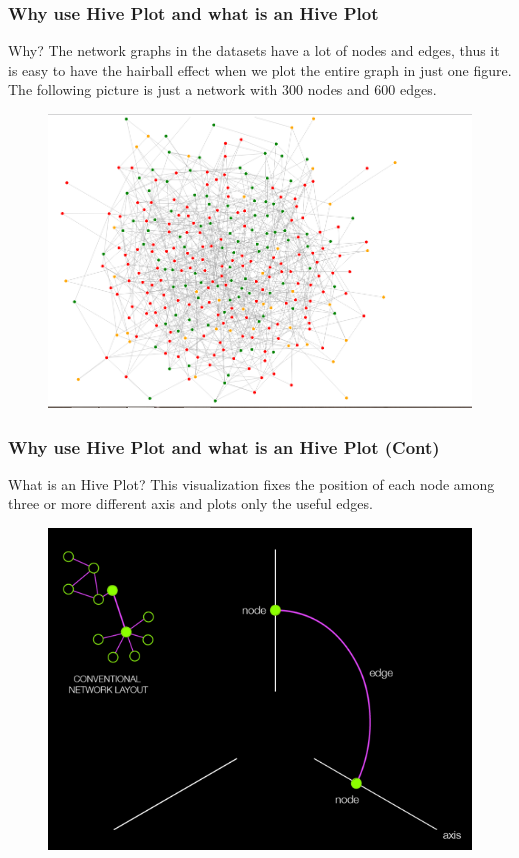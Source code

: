 \documentclass{beamer}
\begin{document}
\begin{frame}
\frametitle{Why use Hive Plot and what is an Hive Plot}
\begin{block}{Why?}
The network graphs in the datasets have a lot of nodes and edges, thus it is easy to have the hairball effect when we plot the entire graph in just one figure. The following picture is just a network with 300 nodes and 600 edges.
\end{block}
\begin{figure}[H]\label{fig:perc_diff}
\centering	
\includegraphics[scale=0.30]{img/graph4.PNG}
\end{figure}

\end{frame}


\begin{frame}
\frametitle{Why use Hive Plot and what is an Hive Plot (Cont)}
\begin{block}{What is an Hive Plot?}
This visualization fixes the position of each node among three or more different axis and plots only the useful edges.
\end{block}
\begin{figure}[H]\label{fig:perc_diff}
\centering	
\includegraphics[scale=0.30]{img/hive.PNG}
\end{figure}

\end{frame}
\end{document}
